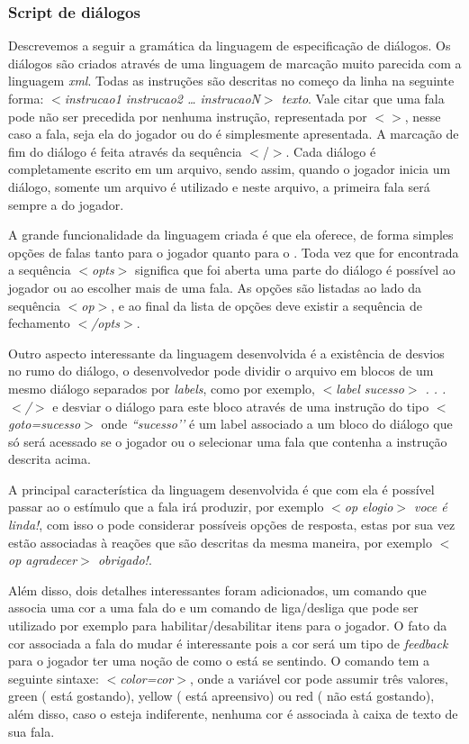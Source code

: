 \subsubsection{Script de diálogos}
Descrevemos a seguir a gramática da linguagem de especificação de diálogos.
Os diálogos são criados através de uma linguagem de marcação muito parecida com a linguagem \emph{xml}. Todas as instruções são descritas no começo da linha na seguinte forma: \emph{$<$instrucao1 instrucao2 … instrucaoN$>$ texto}. Vale citar que uma fala pode não ser precedida por nenhuma instrução, representada por \emph{$<>$}, nesse caso a fala, seja ela do jogador ou do \npc{} é simplesmente apresentada. A marcação de fim do diálogo é feita através da sequência $<$/$>$.
Cada diálogo é completamente escrito em um arquivo, sendo assim, quando o jogador inicia um diálogo, somente um arquivo é utilizado e neste arquivo, a primeira fala será sempre a do jogador.

A grande funcionalidade da linguagem criada é que ela oferece, de forma simples opções de falas tanto para o jogador quanto para o \npc{}. Toda vez que for encontrada a sequência \emph{$<$opts$>$} significa que foi aberta uma parte do diálogo é possível ao jogador ou ao \npc{} escolher mais de uma fala. As opções são listadas ao lado da sequência \emph{$<$op$>$}, e ao final da lista de opções deve existir a sequência de fechamento \emph{$<$/opts$>$}.

Outro aspecto interessante da linguagem desenvolvida é a existência de desvios no rumo do diálogo, o desenvolvedor pode dividir o arquivo em blocos de um mesmo diálogo separados por \emph{labels}, como por exemplo, \emph{$<$label sucesso$>$ . . . $<$/$>$} e desviar o diálogo para este bloco através de uma instrução do tipo \emph{$<$goto=sucesso$>$} onde \emph{``sucesso’’} é um label associado a um bloco do diálogo que só será acessado se o jogador ou o \npc{} selecionar uma fala que contenha a instrução descrita acima.

A principal característica da linguagem desenvolvida é que com ela é possível passar ao \npc{} o estímulo que a fala irá produzir, por exemplo \emph{$<$op elogio$>$ voce é linda!}, com isso o \npc pode considerar possíveis opções de resposta, estas por sua vez estão associadas à reações que são descritas da mesma maneira, por exemplo \emph{$<$op agradecer$>$ obrigado!}. 

Além disso, dois detalhes interessantes foram adicionados, um comando que associa uma cor a uma fala do \npc{} e um comando de liga/desliga que pode ser utilizado por exemplo para habilitar/desabilitar itens para o jogador. O fato da cor associada a fala do \npc{} mudar é interessante pois a cor será um tipo de \emph{feedback} para o jogador ter uma noção de como o \npc{} está se sentindo. O comando tem a seguinte sintaxe: \emph{$<$color=cor$>$}, onde a variável cor pode assumir três valores, green (\npc{} está gostando), yellow (\npc{} está apreensivo) ou red (\npc{} não está gostando), além disso, caso o \npc{} esteja indiferente, nenhuma cor é associada à caixa de texto de sua fala. 

